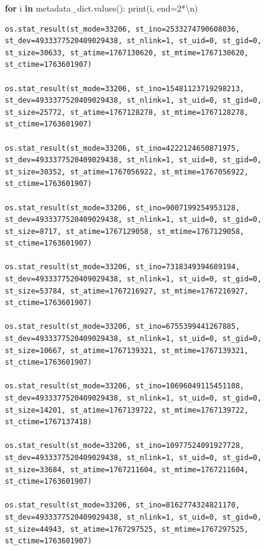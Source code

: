\documentclass[
  spanish,
  letterpaper,
]{scrbook}
\newenvironment{Shaded}{\begin{snugshade}}{\end{snugshade}}
\newcommand{\BuiltInTok}[1]{\textcolor[rgb]{0.00,0.23,0.31}{#1}}
\newcommand{\CharTok}[1]{\textcolor[rgb]{0.13,0.47,0.30}{#1}}
\newcommand{\ControlFlowTok}[1]{\textcolor[rgb]{0.00,0.23,0.31}{\textbf{#1}}}
\newcommand{\DecValTok}[1]{\textcolor[rgb]{0.68,0.00,0.00}{#1}}
\newcommand{\KeywordTok}[1]{\textcolor[rgb]{0.00,0.23,0.31}{\textbf{#1}}}
\newcommand{\NormalTok}[1]{\textcolor[rgb]{0.00,0.23,0.31}{#1}}
\newcommand{\OperatorTok}[1]{\textcolor[rgb]{0.37,0.37,0.37}{#1}}
\newcommand{\StringTok}[1]{\textcolor[rgb]{0.13,0.47,0.30}{#1}}
\theoremstyle{definition}
\theoremstyle{remark}
\begin{document}
\begin{Shaded}
\begin{Highlighting}[]
\ControlFlowTok{for}\NormalTok{ i }\KeywordTok{in}\NormalTok{ metadata\_dict.values():}
    \BuiltInTok{print}\NormalTok{(i, end}\OperatorTok{=}\DecValTok{2}\OperatorTok{*}\StringTok{\textquotesingle{}}\CharTok{\textbackslash{}n}\StringTok{\textquotesingle{}}\NormalTok{)}
\end{Highlighting}
\end{Shaded}

\begin{verbatim}
os.stat_result(st_mode=33206, st_ino=2533274790608036, st_dev=4933377520409029438, st_nlink=1, st_uid=0, st_gid=0, st_size=30633, st_atime=1767130620, st_mtime=1767130620, st_ctime=1763601907)

os.stat_result(st_mode=33206, st_ino=15481123719298213, st_dev=4933377520409029438, st_nlink=1, st_uid=0, st_gid=0, st_size=25772, st_atime=1767128278, st_mtime=1767128278, st_ctime=1763601907)

os.stat_result(st_mode=33206, st_ino=4222124650871975, st_dev=4933377520409029438, st_nlink=1, st_uid=0, st_gid=0, st_size=30352, st_atime=1767056922, st_mtime=1767056922, st_ctime=1763601907)

os.stat_result(st_mode=33206, st_ino=9007199254953128, st_dev=4933377520409029438, st_nlink=1, st_uid=0, st_gid=0, st_size=8717, st_atime=1767129058, st_mtime=1767129058, st_ctime=1763601907)

os.stat_result(st_mode=33206, st_ino=7318349394689194, st_dev=4933377520409029438, st_nlink=1, st_uid=0, st_gid=0, st_size=53784, st_atime=1767216927, st_mtime=1767216927, st_ctime=1763601907)

os.stat_result(st_mode=33206, st_ino=6755399441267885, st_dev=4933377520409029438, st_nlink=1, st_uid=0, st_gid=0, st_size=10667, st_atime=1767139321, st_mtime=1767139321, st_ctime=1763601907)

os.stat_result(st_mode=33206, st_ino=10696049115451108, st_dev=4933377520409029438, st_nlink=1, st_uid=0, st_gid=0, st_size=14201, st_atime=1767139722, st_mtime=1767139722, st_ctime=1767137418)

os.stat_result(st_mode=33206, st_ino=10977524091927728, st_dev=4933377520409029438, st_nlink=1, st_uid=0, st_gid=0, st_size=33684, st_atime=1767211604, st_mtime=1767211604, st_ctime=1763601907)

os.stat_result(st_mode=33206, st_ino=8162774324821170, st_dev=4933377520409029438, st_nlink=1, st_uid=0, st_gid=0, st_size=44943, st_atime=1767297525, st_mtime=1767297525, st_ctime=1763601907)


\end{verbatim}
\end{document}
